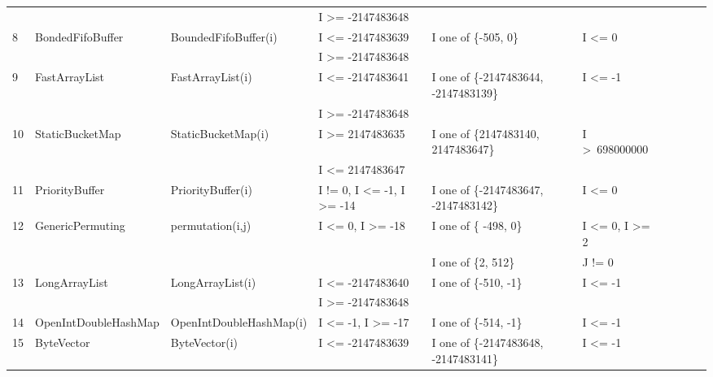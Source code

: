\documentclass[conference]{IEEEtran}
\begin{document}
\begin{table}[h]
{\begin{tabular}{llllllllll}
	&                                             &                                             & I \textgreater= -2147483648				& 										&  			   						\\
8	& BondedFifoBuffer			& BoundedFifoBuffer(i)		& I \textless= -2147483639 					& I one of \{-505, 0\} 					& I \textless= 0 						\\
	&                                             &                                             & I \textgreater= -2147483648				& 										&  			   						\\
9	& FastArrayList				& FastArrayList(i)				& I \textless= -2147483641 					& I one of \{-2147483644, -2147483139\}	& I \textless= -1						\\ 
	&                                             &                                             & I \textgreater= -2147483648				& 										&  			   						\\	
10	& StaticBucketMap			& StaticBucketMap(i)			& I \textgreater= 2147483635				& I one of \{2147483140, 2147483647\} 	& I \textgreater~698000000			\\ 
	&                                             &                                             & I \textless= 2147483647					& 										&  			   						\\	
11	& PriorityBuffer				& PriorityBuffer(i)				& I != 0, I \textless= -1, I \textgreater= -14	& I one of \{-2147483647, -2147483142\}	& I \textless= 0						\\ 
12	& GenericPermuting			& permutation(i,j)			& I \textless= 0, I \textgreater= -18			& I one of \{ -498, 0\}					& I \textless= 0, I \textgreater= 2		\\ 
	&                                             &                                             & 											& I one of \{2, 512\}						& J != 0			   					\\
13	& LongArrayList				& LongArrayList(i)			& I \textless= -2147483640					& I one of \{-510, -1\}					& I \textless= -1						\\ 
	&                                             &                                             & I \textgreater= -2147483648				& 										&  			   						\\
14	& OpenIntDoubleHashMap	& OpenIntDoubleHashMap(i)	& I \textless= -1, I \textgreater= -17			& I one of \{-514, -1\}    					& I \textless= -1						\\ 
15	& ByteVector					& ByteVector(i)				& I \textless= -2147483639					& I one of \{-2147483648, -2147483141\}	& I \textless= -1						\\ 	

\end{tabular}}
\end{table}
\end{document}
